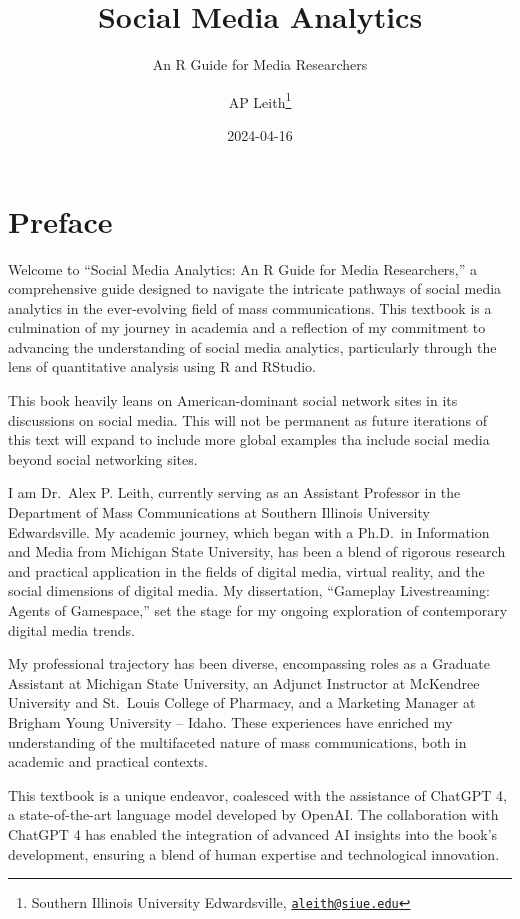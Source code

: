 \documentclass[
]{book}
\title{Social Media Analytics}
\subtitle{An R Guide for Media Researchers}
\author{AP Leith\footnote{Southern Illinois University Edwardsville, \href{mailto:aleith@siue.edu}{\nolinkurl{aleith@siue.edu}}}}
\date{2024-04-16}
\begin{document}
\maketitle

{
\setcounter{tocdepth}{1}
\tableofcontents
}
\hypertarget{preface}{%
\chapter*{Preface}\label{preface}}

Welcome to ``Social Media Analytics: An R Guide for Media Researchers,'' a comprehensive guide designed to navigate the intricate pathways of social media analytics in the ever-evolving field of mass communications. This textbook is a culmination of my journey in academia and a reflection of my commitment to advancing the understanding of social media analytics, particularly through the lens of quantitative analysis using R and RStudio.

This book heavily leans on American-dominant social network sites in its discussions on social media. This will not be permanent as future iterations of this text will expand to include more global examples tha include social media beyond social networking sites.

I am Dr.~Alex P. Leith, currently serving as an Assistant Professor in the Department of Mass Communications at Southern Illinois University Edwardsville. My academic journey, which began with a Ph.D.~in Information and Media from Michigan State University, has been a blend of rigorous research and practical application in the fields of digital media, virtual reality, and the social dimensions of digital media. My dissertation, ``Gameplay Livestreaming: Agents of Gamespace,'' set the stage for my ongoing exploration of contemporary digital media trends.

My professional trajectory has been diverse, encompassing roles as a Graduate Assistant at Michigan State University, an Adjunct Instructor at McKendree University and St.~Louis College of Pharmacy, and a Marketing Manager at Brigham Young University -- Idaho. These experiences have enriched my understanding of the multifaceted nature of mass communications, both in academic and practical contexts.

This textbook is a unique endeavor, coalesced with the assistance of ChatGPT 4, a state-of-the-art language model developed by OpenAI. The collaboration with ChatGPT 4 has enabled the integration of advanced AI insights into the book's development, ensuring a blend of human expertise and technological innovation.
\end{document}
